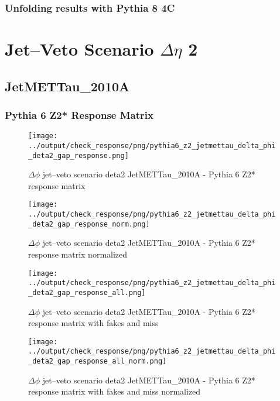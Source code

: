 \documentclass[11pt]{book}
\begin{document}
\clearpage
\subsection{Unfolding results with Pythia 8 4C}


\newpage
\chapter{Jet--Veto Scenario $\Delta\eta$ 2}
\section{JetMETTau\_2010A}
\subsection{Pythia 6 Z2* Response Matrix}

\begin{figure}[ht]
\centering
\texttt{[image: ../output/check\_response/png/pythia6\_z2\_jetmettau\_delta\_phi\_deta2\_gap\_response.png]}
\caption{$\Delta\phi$ jet--veto scenario deta2 JetMETTau\_2010A - Pythia 6 Z2* response matrix}
\label{p6_jetmettau_delta_phi_deta2_gap_response}
\end{figure}

\begin{figure}[ht]
\centering
\texttt{[image: ../output/check\_response/png/pythia6\_z2\_jetmettau\_delta\_phi\_deta2\_gap\_response\_norm.png]}
\caption{$\Delta\phi$ jet--veto scenario deta2 JetMETTau\_2010A - Pythia 6 Z2* response matrix normalized}
\label{p6_jetmettau_delta_phi_deta2_gap_response_norm}
\end{figure}

\begin{figure}[ht]
\centering
\texttt{[image: ../output/check\_response/png/pythia6\_z2\_jetmettau\_delta\_phi\_deta2\_gap\_response\_all.png]}
\caption{$\Delta\phi$ jet--veto scenario deta2 JetMETTau\_2010A - Pythia 6 Z2* response matrix with fakes and miss}
\label{p6_jetmettau_delta_phi_deta2_gap_response_all}
\end{figure}

\begin{figure}[ht]
\centering
\texttt{[image: ../output/check\_response/png/pythia6\_z2\_jetmettau\_delta\_phi\_deta2\_gap\_response\_all\_norm.png]}
\caption{$\Delta\phi$ jet--veto scenario deta2 JetMETTau\_2010A - Pythia 6 Z2* response matrix with fakes and miss normalized}
\label{p6_jetmettau_delta_phi_deta2_gap_response_all_norm}
\end{figure}
\end{document}
